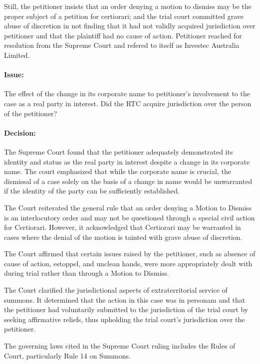 \documentclass[
12pt,
oneside,
onehalfspacing,
headsepline
]{DigestCollection}
\begin{document}
Still, the petitioner insists that an order denying a motion to dismiss may be the proper subject of a petition for certiorari; and the trial court committed grave abuse of discretion in not finding that it had not validly acquired jurisdiction over petitioner and that the plaintiff had no cause of action. Petitioner reached for resolution from the Supreme Court and refered to itself as Investec Australia Limited.

\paragraph{Issue:}

The effect of the change in its corporate name to petitioner's involvement to the case as a real party in interest. Did the RTC acquire jurisdiction over the person of the petitioner?

\paragraph{Decision:}

The Supreme Court found that the petitioner adequately demonstrated its identity and status as the real party in interest despite a change in its corporate name. The court emphasized that while the corporate name is crucial, the dismissal of a case solely on the basis of a change in name would be unwarranted if the identity of the party can be sufficiently established.

The Court reiterated the general rule that an order denying a Motion to Dismiss is an interlocutory order and may not be questioned through a special civil action for Certiorari. However, it acknowledged that Certiorari may be warranted in cases where the denial of the motion is tainted with grave abuse of discretion.

The Court affirmed that certain issues raised by the petitioner, such as absence of cause of action, estoppel, and unclean hands, were more appropriately dealt with during trial rather than through a Motion to Dismiss.

The Court clarified the jurisdictional aspects of extraterritorial service of summons. It determined that the action in this case was in personam and that the petitioner had voluntarily submitted to the jurisdiction of the trial court by seeking affirmative reliefs, thus upholding the trial court's jurisdiction over the petitioner.

The governing laws cited in the Supreme Court ruling includes the Rules of Court, particularly Rule 14 on Summons.
\end{document}
